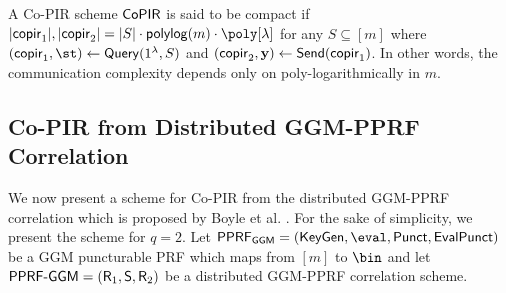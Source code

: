 \begin{definition}[Compactness]
A Co-PIR scheme $\mathsf{CoPIR}$ is said to be compact if $|\copir_1|,|\copir_2|=|S|\cdot \mathsf{polylog}(m)\cdot\poly[\lambda]$ for any $S\subseteq[m]$ where $ (\copir_1,\st)\leftarrow\query(1^\lambda,S)$ and $(\mathsf{copir}_2,\mathbf{y})\leftarrow \mathsf{Send}(\mathsf{copir}_1) $. In other words, the communication complexity depends only on poly-logarithmically in $m$.
\end{definition}



\subsection{Co-PIR from Distributed GGM-PPRF Correlation}
\label{subsec:COPIRfromGGM}

We now present a scheme for Co-PIR from the distributed GGM-PPRF correlation which is proposed by Boyle et al. \cite{CCS:BCGIKRS19}. For the sake of simplicity, we present the scheme for $q=2$. Let $\PPRF_\mathsf{GGM} = (\keygen,\eval,\puncture,\evalpunct)$ be a GGM puncturable PRF which maps from $[m]$ to $\bin$ and let $\mathsf{PPRF}\text{-}\mathsf{GGM}=(\mathsf{R}_1,\mathsf{S},\mathsf{R}_2)$ be a distributed GGM-PPRF correlation scheme.


